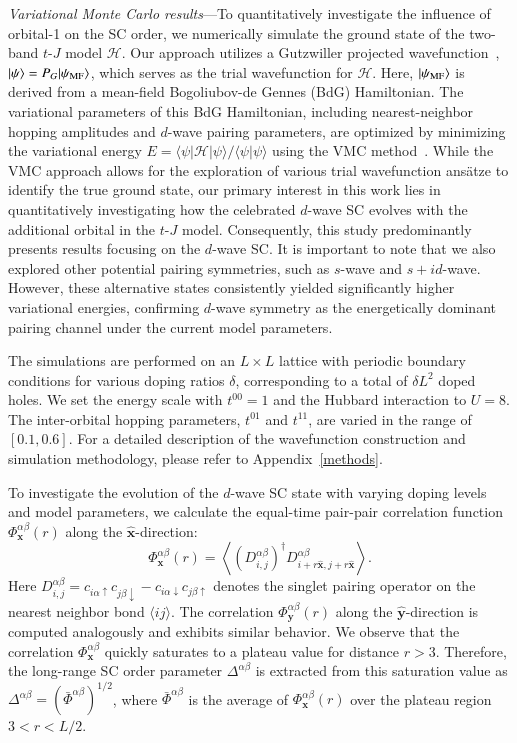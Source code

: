 \documentclass[reprint,superscriptaddress,amsmath,amssymb,aps,twocolumn]{revtex4-1}
\begin{document}
{\color{blue} \em Variational Monte Carlo results}---To quantitatively investigate the influence of orbital-1 on the SC order, we numerically simulate the ground state of the two-band $t$-$J$ model $\mathcal{H}$. Our approach utilizes a Gutzwiller projected wavefunction~\cite{1989Gros}, $|\psi\rangle=P_G|\psi_{\rm MF}\rangle$, which serves as the trial wavefunction for $\mathcal{H}$. Here, $|\psi_{\rm MF}\rangle$ is derived from a mean-field Bogoliubov-de Gennes (BdG) Hamiltonian. The variational parameters of this BdG Hamiltonian, including nearest-neighbor hopping amplitudes and $d$-wave pairing parameters, are optimized by minimizing the variational energy $E=\langle \psi|\mathcal{H}|\psi\rangle/\langle\psi|\psi\rangle$ using the VMC method~\cite{vmc_sorella_1, vmc_sorella_2}. While the VMC approach allows for the exploration of various trial wavefunction ans\"atze to identify the true ground state, our primary interest in this work lies in quantitatively investigating how the celebrated $d$-wave SC evolves with the additional orbital in the $t$-$J$ model. Consequently, this study predominantly presents results focusing on the $d$-wave SC. It is important to note that we also explored other potential pairing symmetries, such as $s$-wave and $s+id$-wave. However, these alternative states consistently yielded significantly higher variational energies, confirming $d$-wave symmetry as the energetically dominant pairing channel under the current model parameters. %

The simulations are performed on an $L\times L$ lattice with periodic boundary conditions for various doping ratios $\delta$, corresponding to a total of $\delta{}L^2$ doped holes. We set the energy scale with $t^{00}=1$ and the Hubbard interaction to $U=8$. The inter-orbital hopping parameters, $t^{01}$ and $t^{11}$, are varied in the range of $[0.1, 0.6]$. For a detailed description of the wavefunction construction and simulation methodology, please refer to Appendix~\ref{methods}.

To investigate the evolution of the $d$-wave SC state with varying doping levels and model parameters, we calculate the equal-time pair-pair correlation function $\Phi^{\alpha\beta}_{\mathbf{x}}(r)$ along the $\hat{\mathbf{x}}$-direction:
\begin{equation}
    \Phi_{\mathbf{x}}^{\alpha\beta}(r)=\left\langle \left(D_{i,j}^{\alpha\beta}\right)^\dagger D_{i+r\hat{\mathbf{x}},j+r\hat{\mathbf{x}}}^{\alpha\beta} \right\rangle.
\end{equation}
Here $D_{i,j}^{\alpha\beta}=c_{i\alpha\uparrow}c_{j\beta\downarrow}-c_{i\alpha\downarrow}c_{j\beta\uparrow}$ denotes the singlet pairing operator on the nearest neighbor bond $\langle ij\rangle$. The correlation $\Phi^{\alpha\beta}_{\mathbf{y}}(r)$ along the $\hat{\mathbf{y}}$-direction is computed analogously and exhibits similar behavior. We observe that the correlation $\Phi_{\mathbf{x}}^{\alpha\beta}$ quickly saturates to a plateau value for distance $r>3$. Therefore, the long-range SC order parameter $\Delta^{\alpha\beta}$ is extracted from this saturation value as $\Delta^{\alpha\beta}= (\bar{\Phi}^{\alpha\beta})^{1/2}$, where $\bar{\Phi}^{\alpha\beta}$ is the average of $\Phi^{\alpha\beta}_{\mathbf{x}}(r)$ over the plateau region $3<r<L/2$. 
\end{document}

